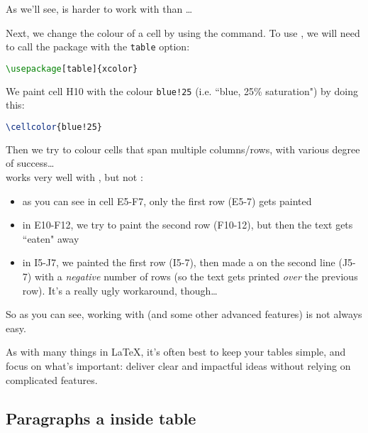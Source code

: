 As we'll see,  is harder to work with than \dots

\bigskip

Next, we change the colour of a cell by using the  command.
To use , we will need to call the  package with the \texttt{table} option:
\begin{lstlisting}[language=tex]
%%% In the preamble
\usepackage[table]{xcolor}
\end{lstlisting}

We paint cell H10 with the colour \texttt{blue!25} (i.e. ``blue, 25\% saturation") by doing this:
\begin{lstlisting}[language=tex]
\cellcolor{blue!25}
\end{lstlisting}

Then we try to colour cells that span multiple columns/rows, with various degree of success\dots \\

 works very well with , but not :
\begin{itemize}
	\item as you can see in cell E5-F7, only the first row (E5-7) gets painted
	\item in E10-F12, we try to paint the second row (F10-12), but then the text gets ``eaten" away
	\item in I5-J7, we painted the first row (I5-7), then made a   on the second line (J5-7) with a \emph{negative} number of rows (so the text gets printed \emph{over} the previous row). It's a really ugly workaround, though\dots
\end{itemize}

\bigskip

So as you can see, working with  (and some other advanced features) is not always easy. \\


\begin{note}
As with many things in \LaTeX, it's often best to keep your tables simple, and focus on what's important: deliver clear and impactful ideas without relying on complicated features.
\end{note}


\bigskip


\subsection{Paragraphs a inside table}


